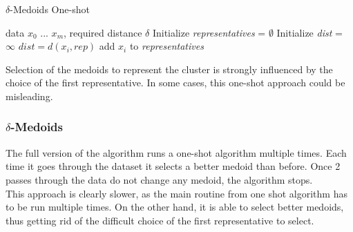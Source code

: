 \documentclass[thesis=B,english]{FITthesis}[2012/10/20]
\begin{document}
\begin{algorithm}                                                                 
    \caption{$\delta$-Medoids One-shot}                                           
    \label{delta_medoids_one_shot}                                                
    \begin{algorithmic}[1]                                                        
        \INPUT data $x_0$ ... $x_m$, required distance $\delta$                   
        \STATE Initialize \textit{representatives} = $\emptyset$                  
            \STATE Initialize \textit{dist} = $\infty$                            
                    \STATE $dist = d(x_i, rep)$                                   
                \ENDIF                                                            
            \ENDFOR                                                               
                \STATE add $x_i$ to \textit{representatives}                      
            \ENDIF                                                                
        \ENDFOR                                                                   
    \end{algorithmic}                                                             
\end{algorithm}                                                                   


Selection of the medoids to represent the cluster is strongly influenced by the choice of the first representative.
In some cases, this one-shot approach could be misleading.

\subsubsection{$\delta$-Medoids}

The full version of the algorithm runs a one-shot algorithm multiple times.
Each time it goes through the dataset it selects a better medoid than before.
Once 2 passes through the data do not change any medoid, the algorithm stops. \\

This approach is clearly slower, as the main routine from one shot algorithm has to be run multiple times.
On the other hand, it is able to select better medoids, thus getting rid of the difficult choice of the first representative to select.
\end{document}
